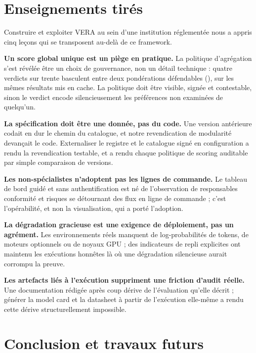 \documentclass[10pt,conference]{IEEEtran}
\begin{document}
\section{Enseignements tirés}
\label{sec:lessons}
Construire et exploiter VERA au sein d'une institution réglementée nous a appris cinq leçons qui se transposent au-delà de ce framework.

\textbf{Un score global unique est un piège en pratique.}
La politique d'agrégation s'est révélée être un choix de gouvernance, non un détail technique : quatre verdicts sur trente basculent entre deux pondérations défendables (), sur les mêmes résultats mis en cache.
La politique doit être visible, signée et contestable, sinon le verdict encode silencieusement les préférences non examinées de quelqu'un.

\textbf{La spécification doit être une donnée, pas du code.}
Une version antérieure codait en dur le chemin du catalogue, et notre revendication de modularité devançait le code.
Externaliser le registre et le catalogue signé en configuration a rendu la revendication testable, et a rendu chaque politique de scoring auditable par simple comparaison de versions.

\textbf{Les non-spécialistes n'adoptent pas les lignes de commande.}
Le tableau de bord guidé et sans authentification est né de l'observation de responsables conformité et risques se détournant des flux en ligne de commande ; c'est l'opérabilité, et non la visualisation, qui a porté l'adoption.

\textbf{La dégradation gracieuse est une exigence de déploiement, pas un agrément.}
Les environnements réels manquent de log-probabilités de tokens, de moteurs optionnels ou de noyaux GPU ; des indicateurs de repli explicites ont maintenu les exécutions honnêtes là où une dégradation silencieuse aurait corrompu la preuve.

\textbf{Les artefacts liés à l'exécution suppriment une friction d'audit réelle.}
Une documentation rédigée après coup dérive de l'évaluation qu'elle décrit ; générer la model card et la datasheet à partir de l'exécution elle-même a rendu cette dérive structurellement impossible.

\section{Conclusion et travaux futurs}
\label{sec:conclusion}
\end{document}
